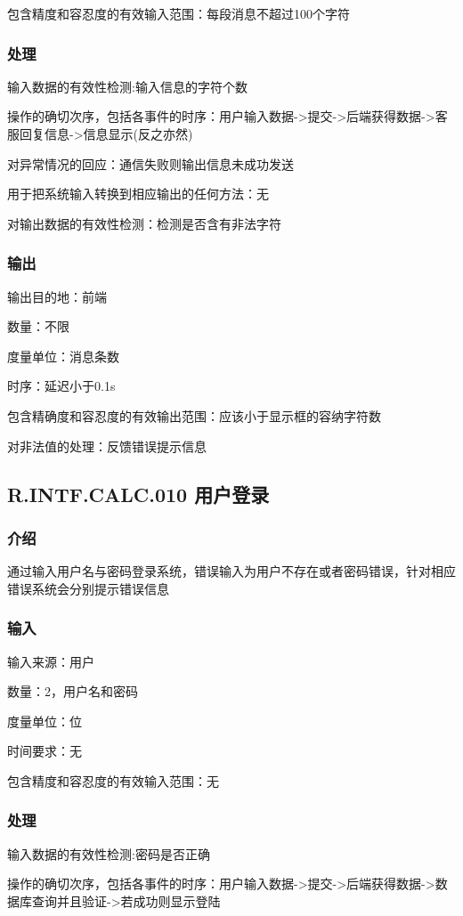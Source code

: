 		包含精度和容忍度的有效输入范围：每段消息不超过100个字符
\subsubsection{处理}
	输入数据的有效性检测:输入信息的字符个数

	操作的确切次序，包括各事件的时序：用户输入数据->提交->后端获得数据->客服回复信息->信息显示(反之亦然)

	对异常情况的回应：通信失败则输出信息未成功发送

	用于把系统输入转换到相应输出的任何方法：无

	对输出数据的有效性检测：检测是否含有非法字符
\subsubsection{输出}
		输出目的地：前端

		数量：不限

		度量单位：消息条数

		时序：延迟小于0.1s

		包含精确度和容忍度的有效输出范围：应该小于显示框的容纳字符数

		对非法值的处理：反馈错误提示信息



\subsection{R.INTF.CALC.010 用户登录}
\subsubsection{介绍}
通过输入用户名与密码登录系统，错误输入为用户不存在或者密码错误，针对相应错误系统会分别提示错误信息
\subsubsection{输入}
		输入来源：用户

		数量：2，用户名和密码

		度量单位：位

		时间要求：无

		包含精度和容忍度的有效输入范围：无
\subsubsection{处理}
	输入数据的有效性检测:密码是否正确

	操作的确切次序，包括各事件的时序：用户输入数据->提交->后端获得数据->数据库查询并且验证->若成功则显示登陆

